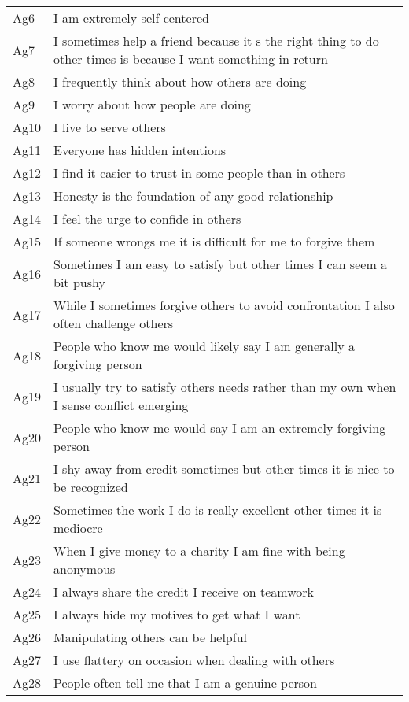 \documentclass[english,man]{apa6}
\theoremstyle{definition}
\theoremstyle{definition}
\theoremstyle{remark}
\begin{document}
\begin{longtable}{ll}
Ag6 & I am extremely self centered\\
Ag7 & I sometimes help a friend because it s the right thing to do  other times is because I want something in return\\
Ag8 & I frequently think about how others are doing\\
\addlinespace
Ag9 & I worry about how people are doing\\
Ag10 & I live to serve others\\
Ag11 & Everyone has hidden intentions\\
Ag12 & I find it easier to trust in some people than in others\\
Ag13 & Honesty is the foundation of any good relationship\\
\addlinespace
Ag14 & I feel the urge to confide in others\\
Ag15 & If someone wrongs me  it is difficult for me to forgive them\\
Ag16 & Sometimes I am easy to satisfy  but other times I can seem a bit pushy\\
Ag17 & While I sometimes forgive others to avoid confrontation  I also often challenge others\\
Ag18 & People who know me would likely say I am generally a forgiving person\\
\addlinespace
Ag19 & I usually try to satisfy others  needs  rather than my own when I sense conflict emerging\\
Ag20 & People who know me would say I am an extremely forgiving person\\
Ag21 & I shy away from credit sometimes  but other times it is nice to be recognized\\
Ag22 & Sometimes the work I do is really excellent  other times it is mediocre\\
Ag23 & When I give money to a charity  I am fine with being anonymous\\
\addlinespace
Ag24 & I always share the credit I receive on teamwork\\
Ag25 & I always hide my motives to get what I want\\
Ag26 & Manipulating others can be helpful\\
Ag27 & I use flattery on occasion when dealing with others\\
Ag28 & People often tell me that I am a genuine person\\
\end{longtable}

\setlength{\parindent}{-0.5in} \setlength{\leftskip}{0.5in}
\end{document}
